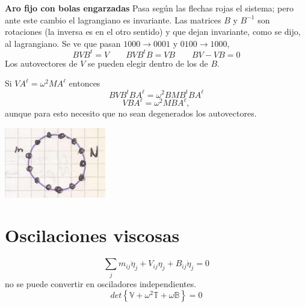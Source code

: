 \documentclass[10pt,oneside]{CBFT_book}
\begin{document}
\begin{ejemplo}{\bf Aro fijo con bolas engarzadas}
Pasa según las flechas rojas el sistema; pero ante este cambio el lagrangiano es invariante.
Las matrices $B$ y $B^{-1}$ son rotaciones (la inversa es en el otro sentido) y que dejan invariante, como se dijo, al lagrangiano.
Se ve que pasan $1000 \to 0001$ y $0100 \to 1000$,
\[
	BVB^t = V \qquad BVB^tB = VB \qquad BV - VB = 0
\]
Los autovectores de $V$ se pueden elegir dentro de los de $B$.

Si $VA^\ell = \omega^2 M A^\ell$ entonces
\[
	BVB^t BA^\ell = \omega^2 BMB^t BA^\ell
\]
\[
	VBA^\ell = \omega^2 MBA^\ell,
\]
aunque para esto necesito que no sean degenerados los autovectores.


\includegraphics[scale=0.5]{images/fig_mc_problema_aro_modos_normales_10.jpg} 

 
\end{ejemplo}




\section{Oscilaciones viscosas}

\[
	\sum_j m_{ij} \ddot{\eta}_j + V_{ij}\eta_j + B_{ij}\dot{\eta}_j = 0
\]
no se puede convertir en osciladores independientes.
\[
	det\left\{ \mathbb{V} + \omega^2 \mathbb{T} + \omega \mathbb{B}\right\} = 0
\]
\end{document}

